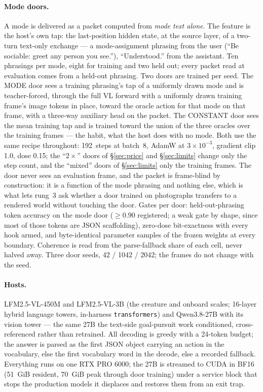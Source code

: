 \documentclass[11pt]{article}
\begin{document}
\paragraph{Mode doors.} A mode is delivered as a packet computed from
\emph{mode text alone}. The feature is the host's own tap: the
last-position hidden state, at the source layer, of a two-turn
text-only exchange --- a mode-assignment phrasing from the user
(``Be sociable: greet any person you see.''), ``Understood.'' from the
assistant. Ten phrasings per mode, eight for training and two held out;
every packet read at evaluation comes from a held-out phrasing. Two
doors are trained per seed. The MODE door sees a training phrasing's
tap of a uniformly drawn mode and is teacher-forced, through the full
VL forward with a uniformly drawn training frame's image tokens in
place, toward the oracle action for that mode on that frame, with a
three-way auxiliary head on the packet. The CONSTANT door sees the mean
training tap and is trained toward the union of the three oracles over
the training frames --- the habit, what the host does with no mode. Both
use the same recipe throughout: 192~steps at batch~8, AdamW at
$3\times10^{-3}$, gradient clip 1.0, dose 0.15; the ``$2\times$'' doors
of \S\ref{sec:price} and \S\ref{sec:limits} change only the step count,
and the ``mixed'' doors of \S\ref{sec:limits} only the training frames.
The door never sees an evaluation frame, and the packet is frame-blind
by construction: it is a function of the mode phrasing and nothing
else, which is what lets rung~3 ask whether a door trained on
photographs transfers to a rendered world without touching the door.
Gates per door: held-out-phrasing token accuracy on the mode door
($\ge 0.90$ registered; a weak gate by shape, since most of those tokens
are JSON scaffolding), zero-dose bit-exactness with every hook armed,
and byte-identical parameter samples of the frozen weights at every
boundary. Coherence is read from the parse-fallback share of each cell,
never halved away. Three door seeds, 42 / 1042 / 2042; the frames do not
change with the seed.

\paragraph{Hosts.} LFM2.5-VL-450M and LFM2.5-VL-3B (the creature and
onboard scales; 16-layer hybrid language towers, in-harness
\texttt{transformers}) and Qwen3.8-27B with its vision tower --- the
same 27B the text-side goal-pursuit work conditioned, cross-referenced
rather than retrained. All decoding is greedy with a 24-token budget;
the answer is parsed as the first JSON object carrying an action in
the vocabulary, else the first vocabulary word in the decode, else a
recorded fallback. Everything runs on one RTX PRO 6000; the 27B is
streamed to CUDA in BF16 (51~GiB resident, 70~GiB peak through door
training) under a service block that stops the production models it
displaces and restores them from an exit trap.
\end{document}
